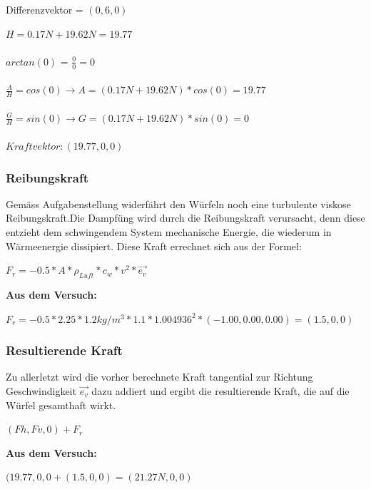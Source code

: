 \documentclass[../main.tex]{subfiles}
\begin{document}
Differenzvektor = $(0,6,0)$\\
\begin{mdframed}
$H = 0.17N +19.62N = 19.77$\\\\
$arctan(0)$ = $\frac{0}{0} = 0$\\\\
$\frac{A}{H}= cos(0) \rightarrow A = (0.17N +19.62N) * cos(0)= 19.77$\\\\
$\frac{G}{H}= sin(0) \rightarrow G = (0.17N +19.62N) * sin(0)= 0$\\\\
$Kraftvektor: (19.77,0,0)$
\end{mdframed}
\subsubsection{Reibungskraft}
Gemäss Aufgabenstellung widerfährt den Würfeln noch eine turbulente viskose Reibungskraft.Die Dampfüng wird durch die Reibungskraft verursacht, denn diese entzieht dem schwingendem System mechanische Energie, die wiederum in Wärmeenergie dissipiert. Diese Kraft errechnet sich aus der Formel:
\begin{mdframed}
$F_r = -0.5 * A*\rho_{Luft}*c_w*v^2*\vec{e_v}$
\end{mdframed}
\textbf {Aus dem Versuch:}
\begin{mdframed}
$F_r = -0.5 * 2.25*1.2kg/m^3*1.1*1.004936^2*(-1.00, 0.00, 0.00) = (1.5,0,0)$
\end{mdframed}
\subsubsection{Resultierende Kraft}
Zu allerletzt wird die vorher berechnete Kraft tangential zur Richtung Geschwindigkeit $\vec{e_v}$ dazu addiert und ergibt die resultierende Kraft, die auf die Würfel gesamthaft wirkt.
\begin{mdframed}
$(Fh,Fv,0) + F_r$
\end{mdframed}
\textbf {Aus dem Versuch:}
\begin{mdframed}
$(19.77,0,0 + (1.5,0,0) = (21.27N,0,0)$
\end{mdframed}
\end{document}
